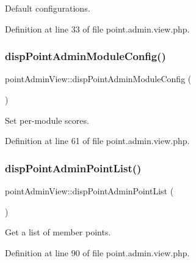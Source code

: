 Default configurations. 



Definition at line 33 of file point.\+admin.\+view.\+php.

\mbox{\label{classpointAdminView_a3f1014ab2fef5e38542e6e38a921bc6e}} 
\subsubsection{\texorpdfstring{disp\+Point\+Admin\+Module\+Config()}{dispPointAdminModuleConfig()}}
{\footnotesize\ttfamily point\+Admin\+View\+::disp\+Point\+Admin\+Module\+Config (\begin{DoxyParamCaption}{ }\end{DoxyParamCaption})}



Set per-\/module scores. 



Definition at line 61 of file point.\+admin.\+view.\+php.

\mbox{\label{classpointAdminView_af4d324fe8612263a3fa6183bf06a5053}} 
\subsubsection{\texorpdfstring{disp\+Point\+Admin\+Point\+List()}{dispPointAdminPointList()}}
{\footnotesize\ttfamily point\+Admin\+View\+::disp\+Point\+Admin\+Point\+List (\begin{DoxyParamCaption}{ }\end{DoxyParamCaption})}



Get a list of member points. 



Definition at line 90 of file point.\+admin.\+view.\+php.

\mbox{\label{classpointAdminView_a0e6e7f367fbb84b3f4e6f95e838c2b50}} 
